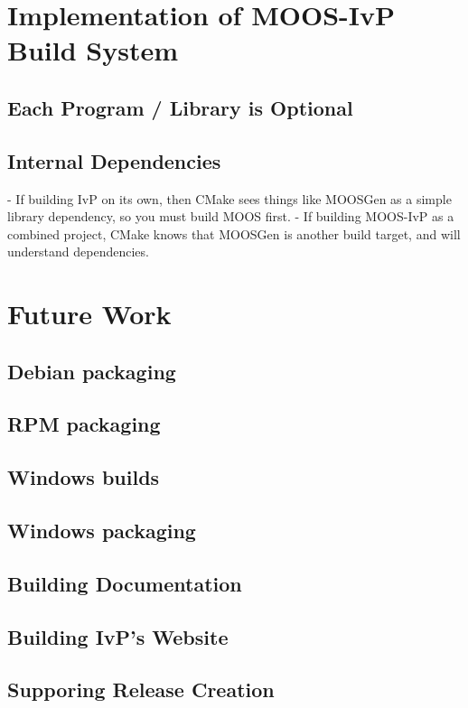 \documentclass[letterpaper,10pt]{article}
\begin{document}
\section{Implementation of MOOS-IvP Build System }
\subsection{Each Program / Library is Optional}
\subsection{Internal Dependencies}
- If building IvP on its own, then CMake sees things like MOOSGen as
a simple library dependency, so you must build MOOS first.
- If building MOOS-IvP as a combined project, CMake knows that MOOSGen
is another build target, and will understand dependencies.

\section{Future Work}


\subsection{Debian packaging}

\subsection{RPM packaging}

\subsection{Windows builds}

\subsection{Windows packaging}

\subsection{Building Documentation}

\subsection{Building IvP's Website}

\subsection{Supporing Release Creation}
\end{document}
